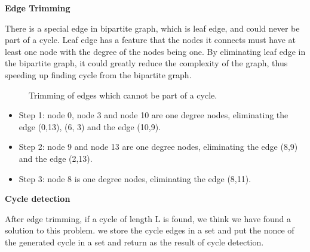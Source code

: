\documentclass[a4paper,11pt]{article}
\begin{document}
\textbf{Edge Trimming}

There is a special edge in bipartite graph, which is leaf edge, and could never be part of a cycle. Leaf edge has a feature that the nodes it connects must have at least one node with the degree of the nodes being one. By eliminating leaf edge in the bipartite graph, it could greatly reduce the complexity of the graph, thus speeding up finding cycle from the bipartite graph.

\begin{figure}[ht]
	\centerline{%
	}
	\caption{Trimming of edges which cannot be part of a cycle.}
\end{figure}

\begin{itemize}
	\item Step 1: node 0, node 3 and node 10 are one degree nodes, eliminating the edge (0,13), (6, 3) and the edge (10,9).
	\item Step 2: node 9 and node 13 are one degree nodes, eliminating the edge (8,9) and the edge (2,13).
	\item Step 3: node 8 is one degree nodes, eliminating the edge (8,11).
\end{itemize}


\textbf{Cycle detection}

After edge trimming, if a cycle of length L is found, we think we have found a solution to this problem.
we store the cycle edges in a set and put the nonce of the generated cycle in a set and
return as the result of cycle detection.
\end{document}
